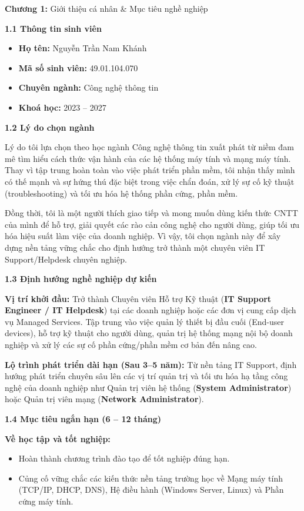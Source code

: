 \documentclass[
]{article}
\begin{document}
\textbf{Chương 1:} Giới thiệu cá nhân \& Mục tiêu nghề nghiệp

\textbf{1.1 Thông tin sinh viên}

\begin{itemize}
\item
  \textbf{Họ tên:} Nguyễn Trần Nam Khánh
\item
  \textbf{Mã số sinh viên:} 49.01.104.070
\item
  \textbf{Chuyên ngành:} Công nghệ thông tin
\item
  \textbf{Khoá học:} 2023 -- 2027
\end{itemize}

\textbf{1.2 Lý do chọn ngành}

Lý do tôi lựa chọn theo học ngành Công nghệ thông tin xuất phát từ niềm
đam mê tìm hiểu cách thức vận hành của các hệ thống máy tính và mạng máy
tính. Thay vì tập trung hoàn toàn vào việc phát triển phần mềm, tôi nhận
thấy mình có thế mạnh và sự hứng thú đặc biệt trong việc chẩn đoán, xử
lý sự cố kỹ thuật (troubleshooting) và tối ưu hóa hệ thống phần cứng,
phần mềm.

Đồng thời, tôi là một người thích giao tiếp và mong muốn dùng kiến thức
CNTT của mình để hỗ trợ, giải quyết các rào cản công nghệ cho người
dùng, giúp tối ưu hóa hiệu suất làm việc của doanh nghiệp. Vì vậy, tôi
chọn ngành này để xây dựng nền tảng vững chắc cho định hướng trở thành
một chuyên viên IT Support/Helpdesk chuyên nghiệp.

\textbf{1.3 Định hướng nghề nghiệp dự kiến}

\textbf{Vị trí khởi đầu:} Trở thành Chuyên viên Hỗ trợ Kỹ thuật
(\textbf{IT Support Engineer / IT Helpdesk}) tại các doanh nghiệp hoặc
các đơn vị cung cấp dịch vụ Managed Services. Tập trung vào việc quản lý
thiết bị đầu cuối (End-user devices), hỗ trợ kỹ thuật cho người dùng,
quản trị hệ thống mạng nội bộ doanh nghiệp và xử lý các sự cố phần
cứng/phần mềm cơ bản đến nâng cao.

\textbf{Lộ trình phát triển dài hạn (Sau 3--5 năm):} Từ nền tảng IT
Support, định hướng phát triển chuyên sâu lên các vị trí quản trị và tối
ưu hóa hạ tầng công nghệ của doanh nghiệp như Quản trị viên hệ thống
(\textbf{System Administrator}) hoặc Quản trị viên mạng (\textbf{Network
Administrator}).

\textbf{1.4 Mục tiêu ngắn hạn (6 -- 12 tháng)}

\textbf{Về học tập và tốt nghiệp:}

\begin{itemize}
\item
  Hoàn thành chương trình đào tạo để tốt nghiệp đúng hạn.
\item
  Củng cố vững chắc các kiến thức nền tảng trường học về Mạng máy tính
  (TCP/IP, DHCP, DNS), Hệ điều hành (Windows Server, Linux) và Phần cứng
  máy tính.
\end{itemize}
\end{document}
